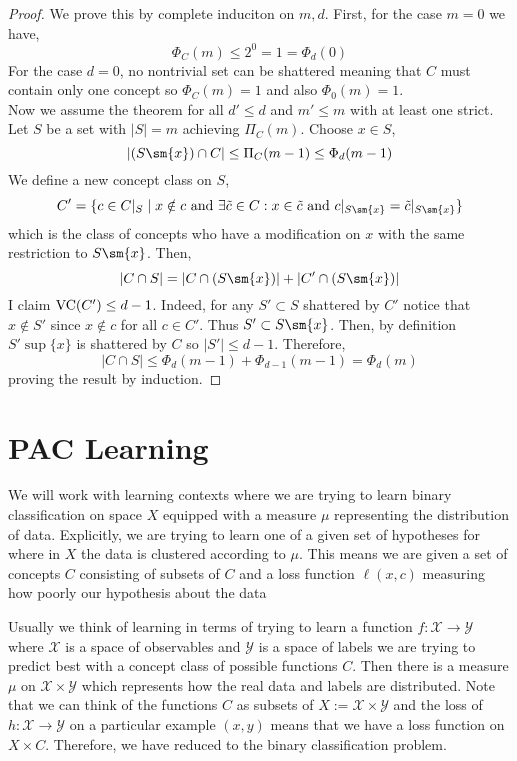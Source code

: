 \documentclass[12pt]{article}
\begin{document}
\begin{proof}
We prove this by complete induciton on $m,d$. First, for the case $m = 0$ we have,
\[ \Phi_C(m) \le 2^0 = 1 = \Phi_d(0) \]
For the case $d = 0$, no nontrivial set can be shattered meaning that $C$ must contain only one concept so $\Phi_C(m) = 1$ and also $\Phi_0(m) = 1$.
\bigskip\\
Now we assume the theorem for all $d' \le d$ and $m' \le m$ with at least one strict. Let $S$ be a set with $|S| = m$ achieving $\Pi_C(m)$. Choose $x \in S$,
\[ | (S \sm \{ x \}) \cap C| \le \Pi_C(m - 1) \le \Phi_d(m-1) \]
We define a new concept class on $S$,
\[ C' = \{ c \in C|_S \mid x \notin c \text{ and } \exists \tilde{c} \in C : x \in \tilde{c} \text{ and } c |_{S \sm \{ x \}} = \tilde{c} |_{S \sm \{ x \}} \} \]
which is the class of concepts who have a modification on $x$ with the same restriction to $S \sm \{ x \}$. Then,
\[ |C \cap S| = |C \cap (S \sm \{ x \})| + |C' \cap (S \sm \{ x \})| \]
I claim $\mathrm{VC}(C') \le d - 1$. Indeed, for any $S' \subset S$ shattered by $C'$ notice that $x \notin S'$ since $x \notin c$ for all $c \in C'$. Thus $S' \subset S \sm \{ x \}$. Then, by definition $S' \sup \{ x \}$ is shattered by $C$ so $|S'| \le d-1$. Therefore,
\[ |C \cap S| \le \Phi_d(m-1) + \Phi_{d-1}(m-1) = \Phi_d(m) \]
proving the result by induction.
\end{proof}


\section{PAC Learning}

We will work with learning contexts where we are trying to learn binary classification on space $X$ equipped with a measure $\mu$ representing the distribution of data. Explicitly, we are trying to learn one of a given set of hypotheses for where in $X$ the data is clustered according to $\mu$. This means we are given a set of concepts $C$ consisting of subsets of $C$ and a loss function $\ell(x, c)$ measuring how poorly our hypothesis about the data 

Usually we think of learning in terms of trying to learn a function $f : \mathcal{X} \to \mathcal{Y}$ where $\mathcal{X}$ is a space of observables and $\mathcal{Y}$ is a space of labels we are trying to predict best with a concept class of possible functions $C$. Then there is a measure $\mu$ on $\mathcal{X} \times \mathcal{Y}$ which represents how the real data and labels are distributed. Note that we can think of the functions $C$ as subsets of $X := \mathcal{X} \times \mathcal{Y}$ and the loss of $h : \mathcal{X} \to \mathcal{Y}$ on a particular example $(x,y)$ means that we have a loss function on $X \times C$. Therefore, we have reduced to the binary classification problem. 
\end{document}
